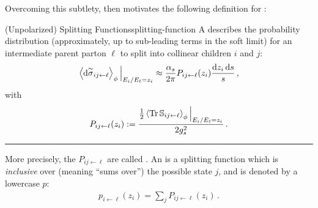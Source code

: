 Overcoming this subtlety,  then motivates the following definition for :
\begin{definitionbox}{(Unpolarized) Splitting Functions}{splitting-function}
    A  describes the probability distribution (approximately, up to sub-leading terms in the soft limit) for an intermediate parent parton \(\ell\) to split into collinear children \(i\) and \(j\):
    \begin{align}
        \left\langle
        \dd \overset{\sim}{\sigma}_{ij\leftarrow \ell}
        \right\rangle_\phi
        \Big|_{E_i / E_{\ell} = z_i}
        \approx
        \frac{\alpha_s}{2\pi}
        P_{ij\leftarrow \ell}(z_i)
        \frac{\dd z_i \, \dd s}{s}
        \,,
    \end{align}
    with
    \begin{align}
        P_{ij \leftarrow \ell}(z_i)
        :=
        \frac{
            \frac{1}{2}
            \left\langle
            \Tr \mathbb{S}_{ij\leftarrow \ell}
            \right\rangle_\phi
            \Big|_{E_i / E_{\ell} = z_i}
        }{2 g_s^2}
        \,.
    \end{align}


    \vspace{10pt}
    \hrule
    \vspace{10pt}

    More precisely, the \(P_{ij \leftarrow \ell}\) are called .
    An  is a splitting function which is \textit{inclusive} over (meaning ``sums over'') the possible state \(j\), and is denoted by a lowercase \(p\):
    \begin{align}
        p_{i\leftarrow \ell}(z_i)
        =
        \sum_j P_{i j \leftarrow \ell}(z_i)
        \,.
    \end{align}
\end{definitionbox}




